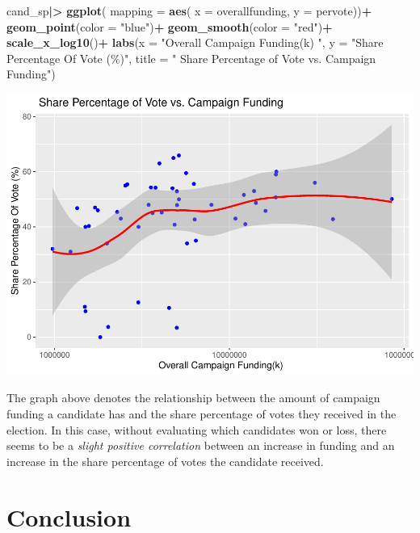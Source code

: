 \documentclass[
]{article}
\newenvironment{Shaded}{\begin{snugshade}}{\end{snugshade}}
\newcommand{\AttributeTok}[1]{\textcolor[rgb]{0.13,0.29,0.53}{#1}}
\newcommand{\FunctionTok}[1]{\textcolor[rgb]{0.13,0.29,0.53}{\textbf{#1}}}
\newcommand{\NormalTok}[1]{#1}
\newcommand{\SpecialCharTok}[1]{\textcolor[rgb]{0.81,0.36,0.00}{\textbf{#1}}}
\newcommand{\StringTok}[1]{\textcolor[rgb]{0.31,0.60,0.02}{#1}}
\begin{document}
\begin{Shaded}
\begin{Highlighting}[]
\NormalTok{cand\_sp}\SpecialCharTok{|\textgreater{}}
  \FunctionTok{ggplot}\NormalTok{(}
    \AttributeTok{mapping =} \FunctionTok{aes}\NormalTok{(}
      \AttributeTok{x =}\NormalTok{ overallfunding,}
      \AttributeTok{y =}\NormalTok{ pervote))}\SpecialCharTok{+}
  \FunctionTok{geom\_point}\NormalTok{(}\AttributeTok{color =} \StringTok{"blue"}\NormalTok{)}\SpecialCharTok{+}
  \FunctionTok{geom\_smooth}\NormalTok{(}\AttributeTok{color =} \StringTok{"red"}\NormalTok{)}\SpecialCharTok{+}
  \FunctionTok{scale\_x\_log10}\NormalTok{()}\SpecialCharTok{+}
  \FunctionTok{labs}\NormalTok{(}\AttributeTok{x =} \StringTok{"Overall Campaign Funding(k) "}\NormalTok{,}
       \AttributeTok{y =} \StringTok{"Share Percentage Of Vote (\%)"}\NormalTok{,}
       \AttributeTok{title =} \StringTok{" Share Percentage of Vote vs. Campaign Funding"}\NormalTok{)}
\end{Highlighting}
\end{Shaded}

\includegraphics{index_files/figure-latex/unnamed-chunk-8-1.pdf}

The graph above denotes the relationship between the amount of campaign
funding a candidate has and the share percentage of votes they received
in the election. In this case, without evaluating which candidates won
or loss, there seems to be a \emph{slight positive correlation} between
an increase in funding and an increase in the share percentage of votes
the candidate received.

\hypertarget{conclusion}{%
\section{\texorpdfstring{\textbf{Conclusion}}{Conclusion}}\label{conclusion}}
\end{document}
